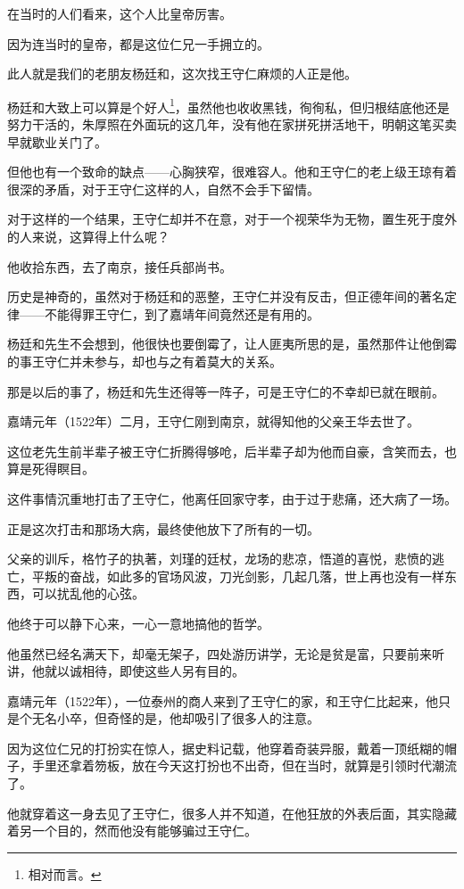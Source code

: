 \begin{multicols}{\theparacolNo}
在当时的人们看来，这个人比皇帝厉害。

因为连当时的皇帝，都是这位仁兄一手拥立的。

此人就是我们的老朋友杨廷和，这次找王守仁麻烦的人正是他。

杨廷和大致上可以算是个好人\footnote{相对而言。}，虽然他也收收黑钱，徇徇私，但归根结底他还是努力干活的，朱厚照在外面玩的这几年，没有他在家拼死拼活地干，明朝这笔买卖早就歇业关门了。

但他也有一个致命的缺点——心胸狭窄，很难容人。他和王守仁的老上级王琼有着很深的矛盾，对于王守仁这样的人，自然不会手下留情。

对于这样的一个结果，王守仁却并不在意，对于一个视荣华为无物，置生死于度外的人来说，这算得上什么呢？

他收拾东西，去了南京，接任兵部尚书。

历史是神奇的，虽然对于杨廷和的恶整，王守仁并没有反击，但正德年间的著名定律——不能得罪王守仁，到了嘉靖年间竟然还是有用的。

杨廷和先生不会想到，他很快也要倒霉了，让人匪夷所思的是，虽然那件让他倒霉的事王守仁并未参与，却也与之有着莫大的关系。

那是以后的事了，杨廷和先生还得等一阵子，可是王守仁的不幸却已就在眼前。

嘉靖元年（1522年）二月，王守仁刚到南京，就得知他的父亲王华去世了。

这位老先生前半辈子被王守仁折腾得够呛，后半辈子却为他而自豪，含笑而去，也算是死得瞑目。

这件事情沉重地打击了王守仁，他离任回家守孝，由于过于悲痛，还大病了一场。

正是这次打击和那场大病，最终使他放下了所有的一切。

父亲的训斥，格竹子的执著，刘瑾的廷杖，龙场的悲凉，悟道的喜悦，悲愤的逃亡，平叛的奋战，如此多的官场风波，刀光剑影，几起几落，世上再也没有一样东西，可以扰乱他的心弦。

他终于可以静下心来，一心一意地搞他的哲学。

他虽然已经名满天下，却毫无架子，四处游历讲学，无论是贫是富，只要前来听讲，他就以诚相待，即使这些人另有目的。

嘉靖元年（1522年），一位泰州的商人来到了王守仁的家，和王守仁比起来，他只是个无名小卒，但奇怪的是，他却吸引了很多人的注意。

因为这位仁兄的打扮实在惊人，据史料记载，他穿着奇装异服，戴着一顶纸糊的帽子，手里还拿着笏板，放在今天这打扮也不出奇，但在当时，就算是引领时代潮流了。

他就穿着这一身去见了王守仁，很多人并不知道，在他狂放的外表后面，其实隐藏着另一个目的，然而他没有能够骗过王守仁。


\end{multicols}

